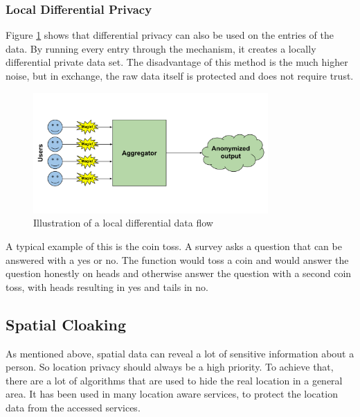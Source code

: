 \subsubsection{Local Differential Privacy}
Figure \ref{fig:local_diff} shows that differential privacy can also be used on the entries of the data. By running every entry through the mechanism, it creates a locally differential private data set. The disadvantage of this method is the much higher noise, but in exchange, the raw data itself is protected and does not require trust.

\begin{figure}[htpb]
  \centering
  \includegraphics[width=0.8\textwidth]{figures/local_diff.png}
  \caption{Illustration of a local differential data flow} \label{fig:local_diff}
\end{figure}

A typical example of this is the coin toss. A survey asks a question that can be answered with a yes or no. The function would toss a coin and would answer the question honestly on heads and otherwise answer the question with a second coin toss, with heads resulting in yes and tails in no. 

\subsection{Spatial Cloaking}
As mentioned above, spatial data can reveal a lot of sensitive information about a person. So location privacy should always be a high priority. To achieve that, there are a lot of algorithms that are used to hide the real location in a general area. It has been used in many location aware services, to protect the location data from the accessed services.

